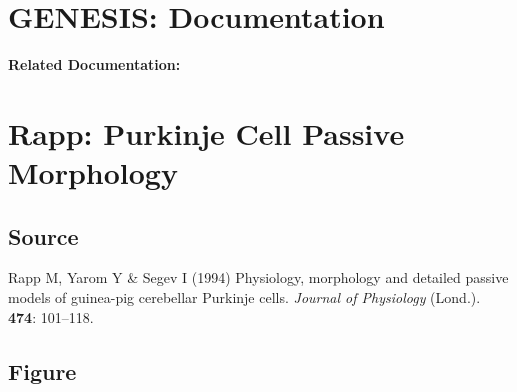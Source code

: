\documentclass[12pt]{article}
\begin{document}
\section*{GENESIS: Documentation}

{\bf Related Documentation:}

\section*{Rapp: Purkinje Cell Passive Morphology}

\subsection*{Source}

Rapp M, Yarom Y \& Segev I (1994) Physiology, morphology and detailed passive models of guinea-pig cerebellar Purkinje cells. {\it Journal of Physiology} (Lond.). {\bf 474}: 101--118.

\subsection*{Figure}
\end{document}
